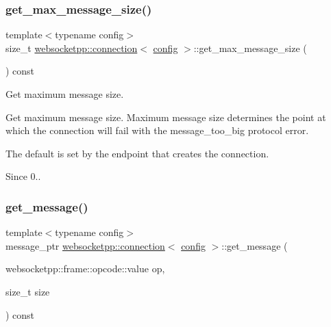 \subsubsection{\texorpdfstring{get\+\_\+max\+\_\+message\+\_\+size()}{get\_max\_message\_size()}}
{\footnotesize\ttfamily template$<$typename config$>$ \\
size\+\_\+t \mbox{\hyperlink{classwebsocketpp_1_1connection}{websocketpp\+::connection}}$<$ \mbox{\hyperlink{classconfig}{config}} $>$\+::get\+\_\+max\+\_\+message\+\_\+size (\begin{DoxyParamCaption}{ }\end{DoxyParamCaption}) const\hspace{0.3cm}{\ttfamily [inline]}}



Get maximum message size. 

Get maximum message size. Maximum message size determines the point at which the connection will fail with the message\+\_\+too\+\_\+big protocol error.

The default is set by the endpoint that creates the connection.

\begin{DoxySince}{Since}
0.. 
\end{DoxySince}
\mbox{\label{classwebsocketpp_1_1connection_a854cb45d1c96d0a2e19ad0ba827a0f9e}} 
\subsubsection{\texorpdfstring{get\+\_\+message()}{get\_message()}}
{\footnotesize\ttfamily template$<$typename config$>$ \\
message\+\_\+ptr \mbox{\hyperlink{classwebsocketpp_1_1connection}{websocketpp\+::connection}}$<$ \mbox{\hyperlink{classconfig}{config}} $>$\+::get\+\_\+message (\begin{DoxyParamCaption}\item[{websocketpp\+::frame\+::opcode\+::value}]{op,  }\item[{size\+\_\+t}]{size }\end{DoxyParamCaption}) const\hspace{0.3cm}{\ttfamily [inline]}}



